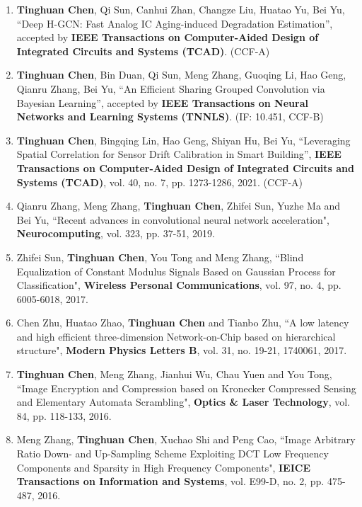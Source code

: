 \documentclass[letterpaper,11pt]{article}%
\begin{document}
\begin{enumerate}[(1)]

\item \textbf{Tinghuan Chen}, Qi Sun, Canhui Zhan, Changze Liu, Huatao Yu, Bei Yu, ``Deep H-GCN: Fast Analog IC Aging-induced Degradation Estimation'', accepted by \textbf{IEEE Transactions on Computer-Aided Design of Integrated Circuits and Systems (TCAD)}. (CCF-A)

\item \textbf{Tinghuan Chen}, Bin Duan, Qi Sun, Meng Zhang, Guoqing Li, Hao Geng, Qianru Zhang, Bei Yu, ``An Efficient Sharing Grouped Convolution via Bayesian Learning'', accepted by \textbf{IEEE Transactions on Neural Networks and Learning Systems (TNNLS)}. (IF: 10.451, CCF-B)


\item \textbf{Tinghuan Chen}, Bingqing Lin, Hao Geng, Shiyan Hu, Bei Yu, ``Leveraging Spatial Correlation for Sensor Drift Calibration in Smart Building'', \textbf{IEEE Transactions on Computer-Aided Design of Integrated Circuits and Systems (TCAD)}, vol. 40, no. 7, pp. 1273-1286, 2021. (CCF-A)


\item Qianru Zhang, Meng Zhang, \textbf{Tinghuan Chen}, Zhifei Sun, Yuzhe Ma and Bei Yu, ``Recent advances in convolutional neural network acceleration", \textbf{Neurocomputing}, vol. 323, pp. 37-51, 2019.


\item Zhifei Sun, \textbf{Tinghuan Chen}, You Tong and Meng Zhang, ``Blind Equalization of Constant Modulus Signals Based on Gaussian Process for Classification", \textbf{Wireless Personal Communications}, vol. 97, no. 4, pp. 6005-6018, 2017.

\item Chen Zhu, Huatao Zhao, \textbf{Tinghuan Chen} and Tianbo Zhu, ``A low latency and high efficient three-dimension Network-on-Chip based on hierarchical structure", \textbf{Modern Physics Letters B}, vol. 31, no. 19-21, 1740061, 2017.

\item \textbf{Tinghuan Chen}, Meng Zhang, Jianhui Wu, Chau Yuen and You Tong, ``Image Encryption and Compression based on Kronecker Compressed Sensing and Elementary Automata Scrambling", \textbf{Optics \& Laser Technology}, vol. 84, pp. 118-133, 2016.

\item Meng Zhang, \textbf{Tinghuan Chen}, Xuchao Shi and Peng Cao, ``Image Arbitrary Ratio Down- and Up-Sampling Scheme Exploiting DCT Low Frequency Components and Sparsity in High Frequency Components", \textbf{IEICE Transactions on Information and Systems}, vol. E99-D, no. 2, pp. 475-487, 2016.


\end{enumerate}
\end{document}
